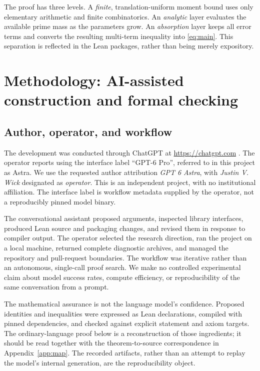 \documentclass[11pt,a4paper]{article}
\theoremstyle{definition}
\theoremstyle{remark}
\numberwithin{equation}{section}
\begin{document}
The proof has three levels. A \emph{finite}, translation-uniform moment bound
uses only elementary arithmetic and finite combinatorics. An \emph{analytic}
layer evaluates the available prime mass as the parameters grow. An
\emph{absorption} layer keeps all error terms and converts the resulting
multi-term inequality into \eqref{eq:main}. This separation is reflected in the
Lean packages, rather than being merely expository.

\section{Methodology: AI-assisted construction and formal checking}\label{sec:method}
\subsection{Author, operator, and workflow}
The development was conducted through ChatGPT at \url{https://chatgpt.com}
\citep{OpenAIChatGPT}. The operator reports using the interface label
``GPT-6 Pro'', referred to in this project as Astra. We use the requested author
attribution \emph{GPT 6 Astra}, with \emph{Justin V. Wick} designated as
\emph{operator}. This is an independent project, with no institutional
affiliation. The interface label is workflow metadata supplied by the operator,
not a reproducibly pinned model binary.

The conversational assistant proposed arguments, inspected library interfaces,
produced Lean source and packaging changes, and revised them in response to
compiler output. The operator selected the research direction, ran the project
on a local machine, returned complete diagnostic archives, and managed the
repository and pull-request boundaries. The workflow was iterative rather than
an autonomous, single-call proof search. We make no controlled experimental
claim about model success rates, compute efficiency, or reproducibility of the
same conversation from a prompt.

The mathematical assurance is not the language model's confidence. Proposed
identities and inequalities were expressed as Lean declarations, compiled with
pinned dependencies, and checked against explicit statement and axiom targets.
The ordinary-language proof below is a reconstruction of those ingredients;
it should be read together with the theorem-to-source correspondence in
Appendix~\ref{app:map}. The recorded artifacts, rather than an attempt to replay
the model's internal generation, are the reproducibility object.
\end{document}
